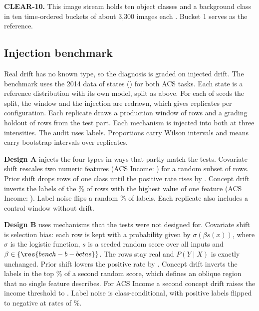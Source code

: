 \documentclass[10pt]{article}
\begin{document}
\textbf{CLEAR-10.} This image stream holds ten object classes and a background class in ten time-ordered buckets of about 3{,}300 images each \cite{lin2021clear}. Bucket 1 serves as the reference.

\subsection{Injection benchmark}
\label{sec:benchmark-setup}
Real drift has no known type, so the diagnosis is graded on injected drift. The benchmark uses the 2014 data of  states () for both ACS tasks. Each state is a reference distribution with its own model, split as above. For each of  seeds the split, the window and the injection are redrawn, which gives  replicates per configuration. Each replicate draws a production window of  rows and a grading holdout of  rows from the test part. Each mechanism is injected into both at three intensities. The audit uses  labels. Proportions carry Wilson intervals \cite{wilson1927} and means carry bootstrap intervals over replicates.

\textbf{Design A} injects the four types in ways that partly match the tests. Covariate shift rescales two numeric features (ACS Income: ) for a random subset of rows. Prior shift drops rows of one class until the positive rate rises by . Concept drift inverts the labels of the \% of rows with the highest value of one feature (ACS Income: ). Label noise flips a random \% of labels. Each replicate also includes a control window without drift.

\textbf{Design B} uses mechanisms that the tests were not designed for. Covariate shift is selection bias: each row is kept with a probability given by $\sigma(\beta s(x))$, where $\sigma$ is the logistic function, $s$ is a seeded random score over all inputs and $\beta\in\{\res{bench-b-betas}\}$. The rows stay real and $P(Y\mid X)$ is exactly unchanged. Prior shift lowers the positive rate by . Concept drift inverts the labels in the top \% of a second random score, which defines an oblique region that no single feature describes. For ACS Income a second concept drift raises the income threshold to . Label noise is class-conditional, with positive labels flipped to negative at rates of \%.
\end{document}

